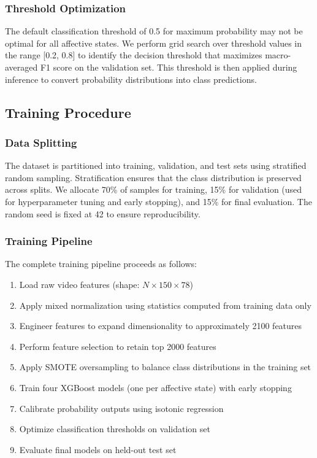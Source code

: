 \documentclass[11pt,a4paper]{article}
\begin{document}
\subsubsection{Threshold Optimization}

The default classification threshold of 0.5 for maximum probability may not be optimal for all affective states. We perform grid search over threshold values in the range [0.2, 0.8] to identify the decision threshold that maximizes macro-averaged F1 score on the validation set. This threshold is then applied during inference to convert probability distributions into class predictions.

\subsection{Training Procedure}

\subsubsection{Data Splitting}

The dataset is partitioned into training, validation, and test sets using stratified random sampling. Stratification ensures that the class distribution is preserved across splits. We allocate 70\% of samples for training, 15\% for validation (used for hyperparameter tuning and early stopping), and 15\% for final evaluation. The random seed is fixed at 42 to ensure reproducibility.

\subsubsection{Training Pipeline}

The complete training pipeline proceeds as follows:

\begin{enumerate}
    \item Load raw video features (shape: $N \times 150 \times 78$)
    \item Apply mixed normalization using statistics computed from training data only
    \item Engineer features to expand dimensionality to approximately 2100 features
    \item Perform feature selection to retain top 2000 features
    \item Apply SMOTE oversampling to balance class distributions in the training set
    \item Train four XGBoost models (one per affective state) with early stopping
    \item Calibrate probability outputs using isotonic regression
    \item Optimize classification thresholds on validation set
    \item Evaluate final models on held-out test set
\end{enumerate}
\end{document}
